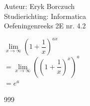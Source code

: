 \documentclass[a4paper]{article}
\begin{document}
  
\noindent \large Auteur: Eryk Borczuch \\
\noindent \large Studierichting: Informatica\\
\noindent \large Oefeningenreeks 2E nr. 4.2\\

\medskip

\normalsize

$\lim\limits_{x \rightarrow \infty} \left(1+\dfrac{1}{x}\right)^{ax} $\\

$= \lim\limits_{x \rightarrow \infty} \left(\left(1+\dfrac{1}{x}\right)^{x}\right)^a $\\

$=e^a$
\begin{thebibliography}{999}
\end{thebibliography}
\end{document}
